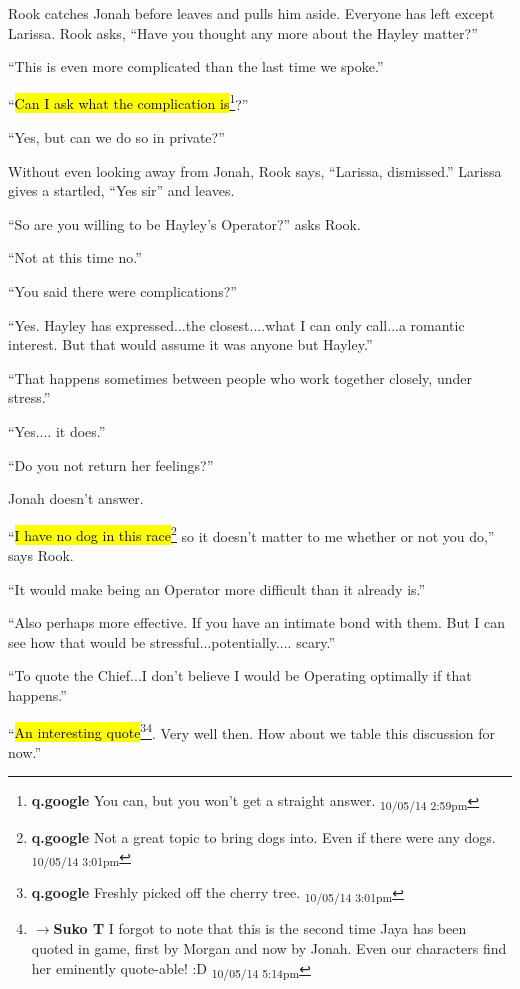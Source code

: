 Rook catches Jonah before leaves and pulls him aside.  Everyone has left except Larissa.  Rook asks, ``Have you thought any more about the Hayley matter?''

``This is even more complicated than the last time we spoke.''

``\hl{Can I ask what the complication is}\footnote{\textbf{q.google }You can, but you won't get a straight answer. \textsubscript{10/05/14 2:59pm}}?''

``Yes, but can we do so in private?''

Without even looking away from Jonah, Rook says, ``Larissa, dismissed.''  Larissa gives a startled, ``Yes sir'' and leaves.

``So are you willing to be Hayley's Operator?'' asks Rook.

``Not at this time no.''

``You said there were complications?''

``Yes.  Hayley has expressed...the closest....what I can only call...a romantic interest.  But that would assume it was anyone but Hayley.''

``That happens sometimes between people who work together closely, under stress.''

``Yes.... it does.''

``Do you not return her feelings?''

Jonah doesn't answer.

``\hl{I have no dog in this race}\footnote{\textbf{q.google }Not a great topic to bring dogs into.  Even if there were any dogs. \textsubscript{10/05/14 3:01pm}} so it doesn't matter to me whether or not you do,'' says Rook.

``It would make being an Operator more difficult than it already is.''

``Also perhaps more effective.  If you have an intimate bond with them.  But I can see how that would be stressful...potentially.... scary.''

``To quote the Chief...I don't believe I would be Operating optimally if that happens.''

``\hl{An interesting quote}\footnote{\textbf{q.google }Freshly picked off the cherry tree. \textsubscript{10/05/14 3:01pm}}\footnote{$\rightarrow$\textbf{Suko T }I forgot to note that this is the second time Jaya has been quoted in game, first by Morgan and now by Jonah.  Even our characters find her eminently quote-able! :D \textsubscript{10/05/14 5:14pm}}.  Very well then.  How about we table this discussion for now.''

